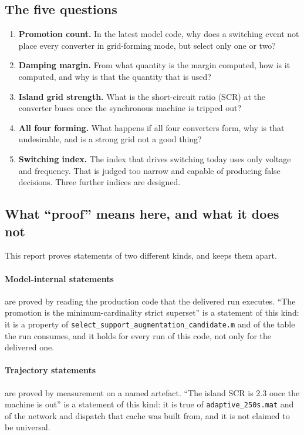 \documentclass[12pt,a4paper]{article}
\theoremstyle{remark}
\newcommand{\code}[1]{\texttt{\small #1}}
\begin{document}
\subsection{The five questions}

\begin{enumerate}[leftmargin=1.6em,itemsep=2pt]
\item \textbf{Promotion count.} In the latest model code, why does a switching
      event not place every converter in grid-forming mode, but select only one
      or two?
\item \textbf{Damping margin.} From what quantity is the margin computed, how is
      it computed, and why is that the quantity that is used?
\item \textbf{Island grid strength.} What is the short-circuit ratio (SCR) at
      the converter buses once the synchronous machine is tripped out?
\item \textbf{All four forming.} What happens if all four converters form, why is
      that undesirable, and is a strong grid not a good thing?
\item \textbf{Switching index.} The index that drives switching today uses only
      voltage and frequency. That is judged too narrow and capable of producing
      false decisions. Three further indices are designed.
\end{enumerate}

\subsection{What ``proof'' means here, and what it does not}

This report proves statements of two different kinds, and keeps them apart.

\paragraph{Model-internal statements} are proved by reading the production code
that the delivered run executes. ``The promotion is the minimum-cardinality
strict superset'' is a statement of this kind: it is a property of
\code{select\_support\_augmentation\_candidate.m} and of the table the run
consumes, and it holds for every run of this code, not only for the delivered
one.

\paragraph{Trajectory statements} are proved by measurement on a named artefact.
``The island SCR is $2.3$ once the machine is out'' is a statement of this kind:
it is true of \code{adaptive\_250s.mat} and of the network and dispatch that
cache was built from, and it is not claimed to be universal.
\end{document}

